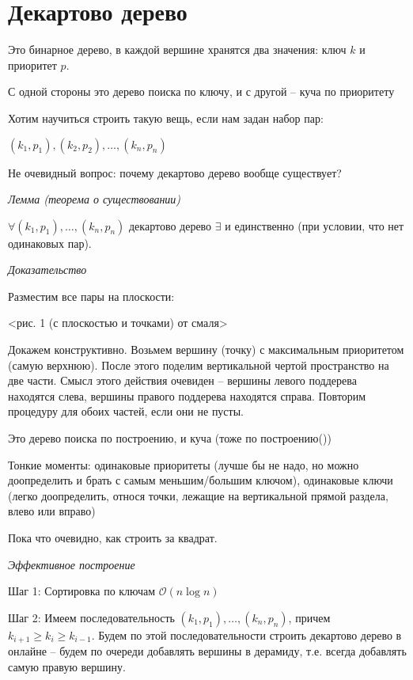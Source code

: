 \documentclass[fleqn, 12pt]{article}
\newcommand{\bigo}{\mathcal{O}}
\begin{document}
\section{Декартово дерево}

Это бинарное дерево, в каждой вершине хранятся два значения: ключ $ k $ и приоритет $ p $.

С одной стороны это дерево поиска по ключу, и с другой -- куча по приоритету

Хотим научиться строить такую вещь, если нам задан набор пар:

$ (k_1, p_1), (k_2, p_2), \ldots , (k_n, p_n) $

Не очевидный вопрос: почему декартово дерево вообще существует?

\textit{Лемма (теорема о существовании)}

$ \forall (k_1, p_1), \ldots , (k_n, p_n) $ декартово дерево $ \exists $ и единственно (при условии, что нет одинаковых пар).

\textit{Доказательство}

Разместим все пары на плоскости:

<рис. 1 (с плоскостью и точками) от смаля>

Докажем конструктивно. Возьмем вершину (точку) с максимальным приоритетом (самую верхнюю). После этого поделим вертикальной чертой пространство на две части. Смысл этого действия очевиден -- вершины левого поддерева находятся слева, вершины правого поддерева находятся справа. Повторим процедуру для обоих частей, если они не пусты.

Это дерево поиска по построению, и куча (тоже по построению())

Тонкие моменты: одинаковые приоритеты (лучше бы не надо, но можно доопределить и брать с самым меньшим/большим ключом), одинаковые ключи (легко доопределить, относя точки, лежащие на вертикальной прямой раздела, влево или вправо)

\bigskip

Пока что очевидно, как строить за квадрат.

\textit{Эффективное построение}

Шаг 1: Сортировка по ключам $ \bigo(n \log n) $

Шаг 2: Имеем последовательность $ (k_1, p_1), \ldots , (k_n, p_n) $, причем $ k_{i + 1} \geqslant k_i \geqslant k_{i - 1} $. Будем по этой последовательности строить декартово дерево в онлайне -- будем по очереди добавлять вершины в дерамиду, т.е. всегда добавлять самую правую вершину. 
\end{document}
